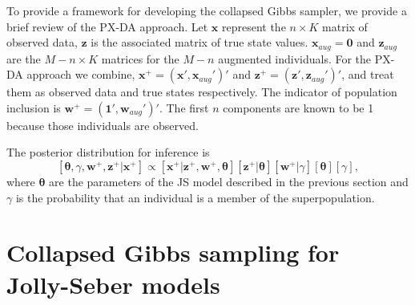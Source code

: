 \documentclass[12pt]{article}
\newcommand{\bx}{\ensuremath{\mathbf{x}}}
\newcommand{\bz}{\ensuremath{\mathbf{z}}}
\newcommand{\bt}{\ensuremath{\boldsymbol{\theta}}}
\newcommand{\bvt}{\ensuremath{\boldsymbol{\vartheta}}}
\newcommand{\bw}{\ensuremath{\mathbf{w}}}
\begin{document}
To provide a framework for developing the collapsed Gibbs sampler, we provide a brief review of the PX-DA approach. Let $\bx$ represent the $n\times K$ matrix of observed data, $\bz$ is the associated matrix of true state values. $\bx_{aug} = \mathbf{0}$ and $\bz_{aug}$ are the $M-n \times K$ matrices for the $M-n$ augmented individuals. For the PX-DA approach we combine, $\bx^+ = (\bx',\bx_{aug}')'$ and $\bz^+ = (\bz',\bz_{aug}')'$, and treat them as observed data and true states respectively. The indicator of population inclusion is $\bw^+ = (\mathbf{1}',\bw_{aug}')'$. The first $n$ components are known to be 1 because those individuals are observed. 

The posterior distribution for inference is
\begin{equation}
\label{eq:pxda.post}
[\bt,\gamma,\bw^+, \bz^+|\bx^+] \propto [\bx^+|\bz^+,\bw^+,\bt][\bz^+|\bt][\bw^+|\gamma][\bt][\gamma],
\end{equation}
where $\bt$ are the parameters of the JS model described in the previous section and $\gamma$ is the probability that an individual is a member of the superpopulation. 



\section{Collapsed Gibbs sampling for Jolly-Seber models}
\end{document}
